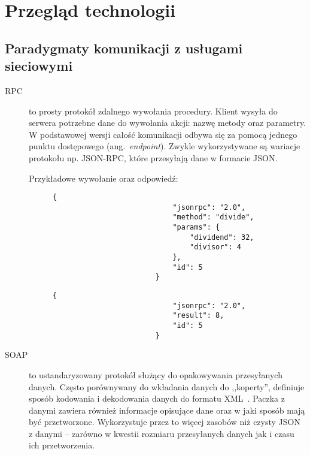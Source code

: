 
\chapter{Przegląd technologii}
\label{sec:przegTech}

\section{Paradygmaty komunikacji z usługami sieciowymi}
	\begin{description}
		\item[RPC] to prosty protokół zdalnego wywołania procedury.
			Klient wysyła do serwera potrzebne dane do wywołania akcji: nazwę metody oraz parametry.
			W podstawowej wersji całość komunikacji odbywa się za pomocą jednego punktu dostępowego (ang.\ \emph{endpoint}).
			Zwykle wykorzystywane są wariacje protokołu np. JSON-RPC, które przesyłają dane w formacie JSON.

			Przykładowe wywołanie oraz odpowiedź:
			\begin{figure}[!htb]
				\centering
				\begin{minipage}{.5\textwidth}
					\begin{lstlisting}[label=lst:rpcReq]
						{
							"jsonrpc": "2.0",
							"method": "divide",
							"params": {
								"dividend": 32,
								"divisor": 4
							},
							"id": 5
						}
					\end{lstlisting}	
				\end{minipage}%
				\begin{minipage}{0.5\textwidth}
					\begin{lstlisting}[label=lst:rpcRes]
						{
							"jsonrpc": "2.0",
							"result": 8,
							"id": 5
						}
					\end{lstlisting}
				\end{minipage}
			\end{figure}

		\item[SOAP] to ustandaryzowany protokół służący do opakowywania przesyłanych danych. 
			Często porównywany do wkładania danych do ,,koperty'', definiuje sposób kodowania i dekodowania danych do formatu XML~\cite{SOAP}.
			Paczka z danymi zawiera również informacje opisujące dane oraz w jaki sposób mają być przetworzone.
			Wykorzystuje przez to więcej zasobów niż czysty JSON z danymi -- zarówno w kwestii rozmiaru przesyłanych danych jak i czasu ich przetworzenia.
			

\end{description}
